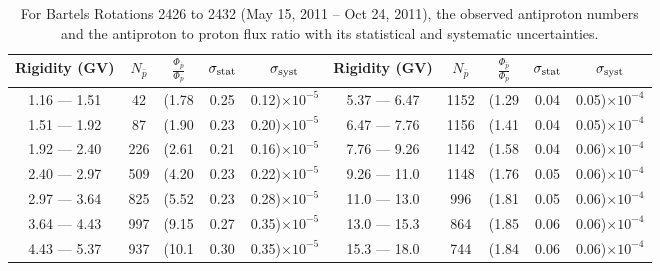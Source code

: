 \begin{table}[p] 
\renewcommand\baselinestretch{1.3}\selectfont
\setlength\tabcolsep{3pt}
\centering
\begin{tabular}{ccccc | ccccc}
\hline
\textbf{Rigidity}  (GV)  & $N_{\bar{p}}$ & $\frac{\Phi_{\bar{p}}}{\Phi_{p}}$ & $\sigma_{\rm{stat}}$ & $\sigma_{\rm{syst}}$ \hspace{1cm}  & \textbf{Rigidity}  (GV)  & $N_{\bar{p}}$ & $\frac{\Phi_{\bar{p}}}{\Phi_{p}}$ & $\sigma_{\rm{stat}}$ & $\sigma_{\rm{syst}}$ \hspace{1cm} \\ 
\hline
1.16 — 1.51   &  42                  &(1.78                          &  0.25              &      0.12)$\times 10^{-5}$  & 5.37 — 6.47                &  1152                    &(1.29                                &  0.04                   &      0.05)$\times 10^{-4}$\\
1.51 — 1.92   &  87                  &(1.90                          &  0.23              &      0.20)$\times 10^{-5}$  & 6.47 — 7.76                &  1156                    &(1.41                                &  0.04                   &      0.05)$\times 10^{-4}$\\
1.92 — 2.40   &  226                &(2.61                          &  0.21              &      0.16)$\times 10^{-5}$  & 7.76 — 9.26                &  1142                    &(1.58                                &  0.04                   &      0.06)$\times 10^{-4}$\\    
2.40 — 2.97   &  509                &(4.20                          &  0.23              &      0.22)$\times 10^{-5}$  & 9.26 — 11.0                &  1148                    &(1.76                                &  0.05                   &      0.06)$\times 10^{-4}$\\    
2.97 — 3.64   &  825                &(5.52                          &  0.23              &      0.28)$\times 10^{-5}$  & 11.0 — 13.0                 &  996                    &(1.81                                &  0.05                   &      0.06)$\times 10^{-4}$\\
3.64 — 4.43   &  997                &(9.15                          &  0.27              &      0.35)$\times 10^{-5}$  & 13.0 — 15.3             &  864                    &(1.85                                & 0.06                  &      0.06)$\times 10^{-4}$\\
4.43 — 5.37   &  937                &(10.1                          &  0.30              &      0.35)$\times 10^{-5}$  & 15.3 — 18.0             &  744                    &(1.84                                & 0.06                  &      0.06)$\times 10^{-4}$\\
\hline
\end{tabular}
\caption[Antiproton to proton flux ratio for Bartels Rotations 2426 to 2432]{For Bartels Rotations 2426 to 2432 (May 15, 2011 – Oct 24, 2011), the observed antiproton numbers and the antiproton to proton flux ratio with its statistical and systematic uncertainties.}
\label{TableOfDependent1}
\end{table}

